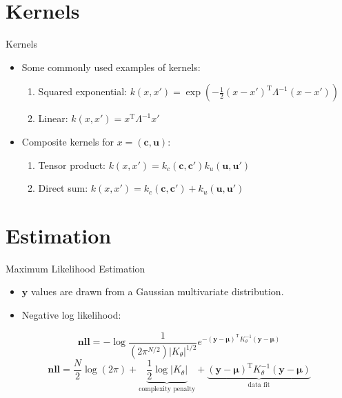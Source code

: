 \documentclass[handout]{beamer}
\newcommand{\sysInput}{\mathbf{u}} %
\newcommand{\context}{\mathbf{c}} %
\newcommand{\observations}{\mathbf{y}} %
\begin{document}
\section{Kernels}
%
\begin{frame}{Kernels}
\begin{itemize}
\item Some commonly used examples of kernels: \pause
	\begin{enumerate}
	\item Squared exponential: $k(x,x') = \exp(-\frac{1}{2}(x-x')^{\mathrm{T}}\Lambda^{-1}(x-x'))$ \pause
	\item Linear: $k(x,x') = x^{\mathrm{T}}\Lambda^{-1}x'$ \pause
	\end{enumerate}
\item Composite kernels for $x = (\context, \sysInput)$: \pause
	\begin{enumerate}
	\item Tensor product: $k(x,x') = k_c(\context, \context')k_u(\sysInput, \sysInput')$ \pause
	\item Direct sum: $k(x,x') = k_c(\context, \context') + k_u(\sysInput, \sysInput')$
	\end{enumerate}
\end{itemize}
\end{frame}
%
\section{Estimation}
%
\begin{frame}{Maximum Likelihood Estimation}
\begin{itemize}
\item $\observations$ values are drawn from a Gaussian multivariate distribution. \pause
\item Negative log likelihood: \pause
\end{itemize}
\begin{equation}
\textbf{nll} = - \log \frac{1}{(2\pi^{N/2})|K_{\theta}|^{1/2}}e^{-(\observations - \mathbf{\mu})^{\mathrm{T}}K_{\theta}^{-1}(\observations - \mathbf{\mu})}
\end{equation}
\pause
\begin{equation}
\textbf{nll} = \frac{N}{2}\log(2\pi) + \underbrace{\frac{1}{2}\log|K_{\theta}|}_{\text{complexity penalty}} + \underbrace{(\observations - \mathbf{\mu})^{\mathrm{T}}K_{\theta}^{-1}(\observations - \mathbf{\mu})}_{\text{data fit}}
\end{equation}
\end{frame}
%
\end{document}
